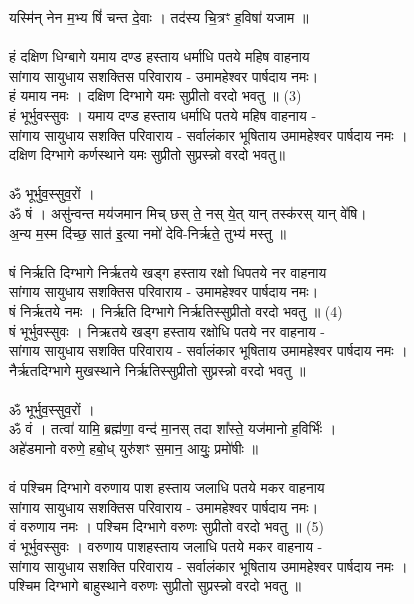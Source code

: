यस्मि॑न् नेन म॒भ्य षिं॑ चन्त दे॒वाः । तद॑स्य चि॒त्रꣳ ह॒विषा॑ यजाम ॥\\
\\
हं दक्षिण धिग्बागे यमाय दण्ड हस्ताय धर्माधि पतये महिष वाहनाय\\
सांगाय सायुधाय सशक्तिस परिवाराय -  उमामहेश्वर पार्षदाय नमः।\\
हं यमाय नमः । दक्षिण दिग्भागे यमः सुप्रीतो  वरदो भवतु ॥ (3)\\
{\small हं भूर्भुवस्सुवः । यमाय दण्ड हस्ताय धर्माधि पतये महिष वाहनाय -\\
सांगाय सायुधाय सशक्ति परिवाराय - सर्वालंकार भूषिताय उमामहेश्वर पार्षदाय नमः ।\\
दक्षिण दिग्भागे कर्णस्थाने यमः सुप्रीतो सुप्रस्न्नो वरदो भवतु॥}\\
\\
ॐ भूर्भुव॒स्सुव॒रों ।\\
{\small ॐ} षं । असु॑न्वन्त मय॑जमान मिच् छस् ते॒ नस् ये॒त् यान् तस्क॑रस् यान् वे॑षि।\\
अ॒न्य म॒स्म दि॑च्छ॒ सात॑ इ॒त्या नमो॑ देवि-निर्ऋते॒ तुभ्य॑ मस्तु ॥\\
\\
षं निर्ऋति दिग्भागे निर्ऋतये खड्ग हस्ताय रक्षो धिपतये नर वाहनाय\\
सांगाय सायुधाय सशक्तिस परिवाराय -  उमामहेश्वर पार्षदाय नमः।\\
षं निर्ऋतये नमः । निर्ऋति दिग्भागे निर्ऋतिस्सुप्रीतो वरदो भवतु ॥ (4)\\
{\small षं भूर्भुवस्सुवः । निऋतये खड्ग हस्ताय रक्षोधि पतये नर वाहनाय -\\
सांगाय सायुधाय सशक्ति परिवाराय - सर्वालंकार भूषिताय उमामहेश्वर पार्षदाय नमः ।\\
नैर्ऋतदिग्भागे मुखस्थाने निर्ऋतिस्सुप्रीतो सुप्रस्न्नो वरदो भवतु ॥}\\
\\
ॐ भूर्भुव॒स्सुव॒रों ।\\
{\small ॐ} वं । तत्वा॑ यामि॒ ब्रह्म॑णा॒ वन्द॑ मा॒नस् तदा शा᳚स्ते॒ यज॑मानो ह॒विर्भिः॑ ।\\
अहे॑डमानो वरुणे॒ हबो॒ध् युरु॑शꣳ स॒मान॒ आयुः॒ प्रमो॑षीः ॥\\
\\
वं पश्चिम दिग्भागे वरुणाय पाश हस्ताय जलाधि पतये मकर वाहनाय\\
सांगाय सायुधाय सशक्तिस परिवाराय -  उमामहेश्वर पार्षदाय नमः।\\
वं वरुणाय नमः । पश्चिम दिग्भागे वरुणः सुप्रीतो वरदो भवतु ॥ (5)\\
{\small वं भूर्भुवस्सुवः । वरुणाय पाशहस्ताय जलाधि पतये मकर वाहनाय -\\
सांगाय सायुधाय सशक्ति परिवाराय - सर्वालंकार भूषिताय उमामहेश्वर पार्षदाय नमः ।\\
पश्चिम दिग्भागे बाहुस्थाने वरुणः सुप्रीतो सुप्रस्न्नो वरदो भवतु ॥}\\

